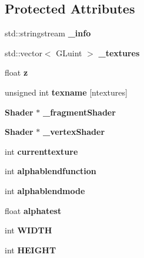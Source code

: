 \subsection*{Protected Attributes}
\begin{DoxyCompactItemize}
\item 
std\-::stringstream {\bfseries \-\_\-info}\label{classSoundfieldViewer_1_1FieldViewerBase_aeb83d0ca23abaf8a0b193705730692ea}

\item 
std\-::vector$<$ G\-Luint $>$ {\bfseries \-\_\-textures}\label{classSoundfieldViewer_1_1FieldViewerBase_a828c3fc9afa4e53748f0a4c83ad0e9e5}

\item 
float {\bfseries z}\label{classSoundfieldViewer_1_1FieldViewerBase_a56c4790db396955255b4c701f31e6f14}

\item 
unsigned int {\bfseries texname} [ntextures]\label{classSoundfieldViewer_1_1FieldViewerBase_a5aecf8fa22b068597e311a6785a31640}

\item 
{\bf Shader} $\ast$ {\bfseries \-\_\-fragment\-Shader}\label{classSoundfieldViewer_1_1FieldViewerBase_a19a330a2231f74bdfedf40615a975099}

\item 
{\bf Shader} $\ast$ {\bfseries \-\_\-vertex\-Shader}\label{classSoundfieldViewer_1_1FieldViewerBase_a0b76185a2e38307c2802e445adc9276a}

\item 
int {\bfseries currenttexture}\label{classSoundfieldViewer_1_1FieldViewerBase_a2abd7ef78f15fac6d317c7afa647eff7}

\item 
int {\bfseries alphablendfunction}\label{classSoundfieldViewer_1_1FieldViewerBase_a635623b5e2e5568a3e020304a85d66c0}

\item 
int {\bfseries alphablendmode}\label{classSoundfieldViewer_1_1FieldViewerBase_ae3725632b78fb1f01e1e063523966d52}

\item 
float {\bfseries alphatest}\label{classSoundfieldViewer_1_1FieldViewerBase_af1e0a8dce2312d8b3a8cca99e6f36425}

\item 
int {\bfseries W\-I\-D\-T\-H}\label{classSoundfieldViewer_1_1FieldViewerBase_ae38fca888afa6c408b5de9ec197f3ac3}

\item 
int {\bfseries H\-E\-I\-G\-H\-T}\label{classSoundfieldViewer_1_1FieldViewerBase_a3c8a6e018c602b2211f3ae52c2c725c0}


\end{DoxyCompactItemize}
